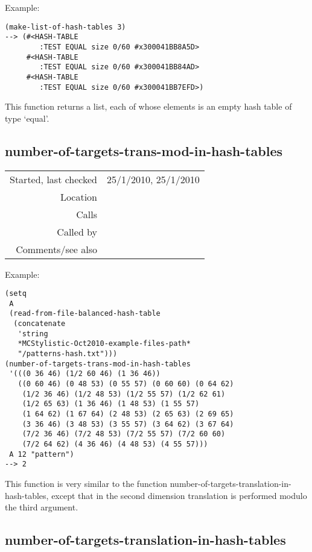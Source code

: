 \vspace{0.5cm}
\noindent Example:
\begin{verbatim}
(make-list-of-hash-tables 3)
--> (#<HASH-TABLE
        :TEST EQUAL size 0/60 #x300041BB8A5D>
     #<HASH-TABLE
        :TEST EQUAL size 0/60 #x300041BB84AD>
     #<HASH-TABLE
        :TEST EQUAL size 0/60 #x300041BB7EFD>)
\end{verbatim}

\noindent This function returns a list, each of whose
elements is an empty hash table of type `equal'.


\subsection*{number-of-targets-trans-mod-in-hash-tables}\label{fun:number-of-targets-trans-mod-in-hash-tables}

\vspace{0.3cm}
\begin{tabular}{r|p{8cm}}
Started, last checked & 25/1/2010, 25/1/2010 \\
Location & \nameref{sec:hash-tables} \\
Calls & \nameref{fun:index-target-translation-mod-in-hash-tables} \\
Called by & \\
Comments/see also &
\end{tabular}

\vspace{0.5cm}
\noindent Example:
\begin{verbatim}
(setq
 A
 (read-from-file-balanced-hash-table
  (concatenate
   'string
   *MCStylistic-Oct2010-example-files-path*
   "/patterns-hash.txt")))
(number-of-targets-trans-mod-in-hash-tables
 '(((0 36 46) (1/2 60 46) (1 36 46))
   ((0 60 46) (0 48 53) (0 55 57) (0 60 60) (0 64 62)
    (1/2 36 46) (1/2 48 53) (1/2 55 57) (1/2 62 61)
    (1/2 65 63) (1 36 46) (1 48 53) (1 55 57)
    (1 64 62) (1 67 64) (2 48 53) (2 65 63) (2 69 65)
    (3 36 46) (3 48 53) (3 55 57) (3 64 62) (3 67 64)
    (7/2 36 46) (7/2 48 53) (7/2 55 57) (7/2 60 60)
    (7/2 64 62) (4 36 46) (4 48 53) (4 55 57)))
 A 12 "pattern")
--> 2
\end{verbatim}

\noindent This function is very similar to the
function number-of-targets-translation-in-hash-tables,
except that in the second dimension translation is
performed modulo the third argument.


\subsection*{number-of-targets-translation-in-hash-tables}\label{fun:number-of-targets-translation-in-hash-tables}

